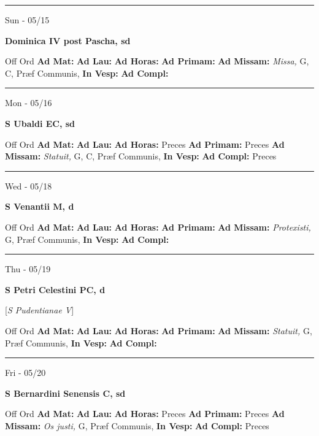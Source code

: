 \documentclass[letterpaper, 10pt]{article}
\begin{document}
\hrule
\begin{center}
Sun - 05/15
\end{center}\textbf{ \large Dominica IV post Pascha, \textnormal{\normalsize sd}}
\begin{justify}
Off Ord
\textbf{Ad Mat: }
\textbf{Ad Lau: }
\textbf{Ad Horas: }
\textbf{Ad Primam: }
\textbf{Ad Missam:} \textit{Missa, } G, C, Præf Communis, 
\textbf{In Vesp: }
\textbf{Ad Compl: }\end{justify}



\hrule
\begin{center}
Mon - 05/16
\end{center}\textbf{ \large S Ubaldi EC, \textnormal{\normalsize sd}}
\begin{justify}
Off Ord
\textbf{Ad Mat: }
\textbf{Ad Lau: }
\textbf{Ad Horas: }Preces
\textbf{Ad Primam: }Preces
\textbf{Ad Missam:} \textit{Statuit, } G, C, Præf Communis, 
\textbf{In Vesp: }
\textbf{Ad Compl: }Preces\end{justify}



\hrule
\begin{center}
Wed - 05/18
\end{center}\textbf{ \large S Venantii M, \textnormal{\normalsize d}}
\begin{justify}
Off Ord
\textbf{Ad Mat: }
\textbf{Ad Lau: }
\textbf{Ad Horas: }
\textbf{Ad Primam: }
\textbf{Ad Missam:} \textit{Protexisti, } G, Præf Communis, 
\textbf{In Vesp: }
\textbf{Ad Compl: }\end{justify}



\hrule
\begin{center}
Thu - 05/19
\end{center}\textbf{ \large S Petri Celestini PC, \textnormal{\normalsize d}}

[\textit{S Pudentianae V}]
\begin{justify}
Off Ord
\textbf{Ad Mat: }
\textbf{Ad Lau: }
\textbf{Ad Horas: }
\textbf{Ad Primam: }
\textbf{Ad Missam:} \textit{Statuit, } G, Præf Communis, 
\textbf{In Vesp: }
\textbf{Ad Compl: }\end{justify}



\hrule
\begin{center}
Fri - 05/20
\end{center}\textbf{ \large S Bernardini Senensis C, \textnormal{\normalsize sd}}
\begin{justify}
Off Ord
\textbf{Ad Mat: }
\textbf{Ad Lau: }
\textbf{Ad Horas: }Preces
\textbf{Ad Primam: }Preces
\textbf{Ad Missam:} \textit{Os justi, } G, Præf Communis, 
\textbf{In Vesp: }
\textbf{Ad Compl: }Preces\end{justify}
\end{document}
